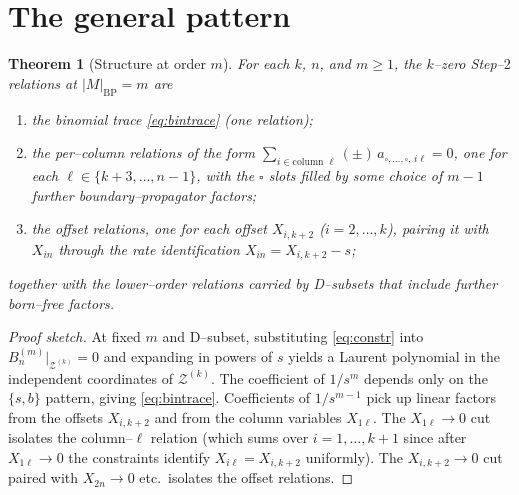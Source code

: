 \documentclass[11pt]{article}
\newtheorem{theorem}{Theorem}
\theoremstyle{definition}
\newcommand{\Z}{\mathcal{Z}}
\newcommand{\X}[1]{X_{#1}}
\begin{document}
\section{The general pattern}
\begin{theorem}[Structure at order $m$]\label{thm:struct}
For each $k$, $n$, and $m\ge1$, the $k$--zero Step--$2$ relations at $|M|_{\mathrm{BP}}=m$ are
\begin{enumerate}[label=\textnormal{(\arabic*)},topsep=2pt,itemsep=1pt]
  \item \emph{the binomial trace} \eqref{eq:bintrace} (one relation);
  \item \emph{the per--column relations} of the form
  $\sum_{i\in\text{column }\ell}(\pm)\,a_{\square,\dots,\square,\,i\ell}=0$,
  one for each $\ell\in\{k{+}3,\dots,n{-}1\}$, with the $\square$ slots filled by some choice of
  $m-1$ further boundary--propagator factors;
  \item \emph{the offset relations}, one for each offset $\X{i,k+2}$ ($i=2,\dots,k$), pairing
  it with $\X{in}$ through the rate identification $\X{in}=\X{i,k+2}-s$;
\end{enumerate}
together with the lower--order relations carried by D--subsets that include further born--free
factors.
\end{theorem}
\begin{proof}[Proof sketch]
At fixed $m$ and D--subset, substituting \eqref{eq:constr} into $B_n^{(m)}|_{\Z^{(k)}}=0$ and
expanding in powers of $s$ yields a Laurent polynomial in the independent coordinates of
$\Z^{(k)}$. The coefficient of $1/s^m$ depends only on the $\{s,b\}$ pattern, giving
\eqref{eq:bintrace}. Coefficients of $1/s^{m-1}$ pick up linear factors from the offsets
$\X{i,k+2}$ and from the column variables $\X{1\ell}$. The $\X{1\ell}\!\to\!0$ cut isolates the
column--$\ell$ relation (which sums over $i=1,\dots,k{+}1$ since after $\X{1\ell}\!\to\!0$ the
constraints identify $\X{i\ell}=\X{i,k+2}$ uniformly). The $\X{i,k+2}\!\to\!0$ cut paired with
$\X{2n}\!\to\!0$ etc.\ isolates the offset relations.
\end{proof}
\end{document}
